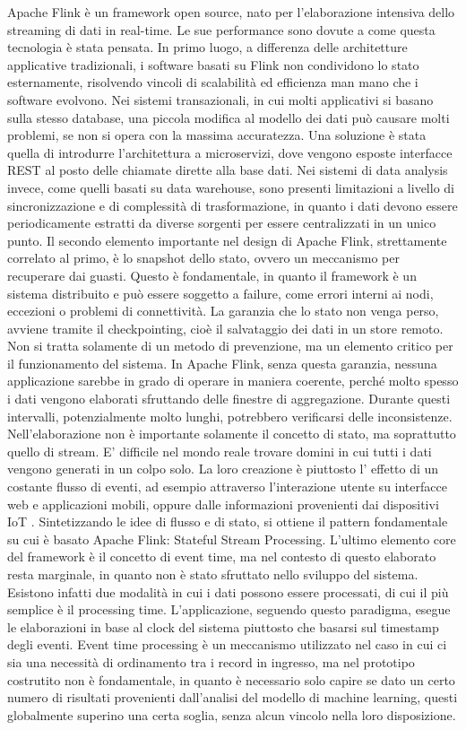 Apache Flink è un framework open source, nato per l'elaborazione intensiva dello streaming di dati in real-time. Le sue performance sono dovute a come questa tecnologia è stata pensata. In primo luogo, a differenza delle architetture applicative tradizionali, i software basati su Flink non condividono lo stato esternamente, risolvendo vincoli di scalabilità ed efficienza man mano che i software evolvono. Nei sistemi transazionali, in cui molti applicativi si basano sulla stesso database, una piccola modifica al modello dei dati può causare molti problemi, se non si opera con la massima accuratezza. Una soluzione è stata quella di introdurre l'architettura a microservizi, dove vengono esposte interfacce REST al posto delle chiamate dirette alla base dati. Nei sistemi di data analysis invece, come quelli basati su data warehouse, sono presenti limitazioni a livello di sincronizzazione e di complessità di trasformazione, in quanto i dati devono essere periodicamente estratti da diverse sorgenti per essere centralizzati in un unico punto. Il secondo elemento importante nel design di Apache Flink, strettamente correlato al primo, è lo snapshot dello stato, ovvero un meccanismo per recuperare dai guasti. Questo è fondamentale, in quanto il framework è un sistema distribuito e può essere soggetto a failure, come errori interni ai nodi, eccezioni o problemi di connettività. La garanzia che lo stato non venga perso, avviene tramite il checkpointing, cioè il salvataggio dei dati in un store remoto. Non si tratta solamente di un metodo di prevenzione, ma un elemento critico per il funzionamento del sistema. In Apache Flink, senza questa garanzia, nessuna applicazione sarebbe in grado di operare in maniera coerente, perché molto spesso i dati vengono elaborati sfruttando delle finestre di aggregazione. Durante questi intervalli, potenzialmente molto lunghi, potrebbero verificarsi delle inconsistenze. Nell'elaborazione non è importante solamente il concetto di stato, ma soprattutto quello di stream. E' difficile nel mondo reale trovare domini in cui tutti i dati vengono generati in un colpo solo. La loro creazione è piuttosto l' effetto di un costante flusso di eventi, ad esempio attraverso l'interazione utente su interfacce web e applicazioni mobili, oppure dalle informazioni provenienti dai dispositivi IoT \cite{a14Flink}.
Sintetizzando le idee di flusso e di stato, si ottiene il pattern fondamentale su cui è basato Apache Flink: Stateful Stream Processing. L'ultimo elemento core del framework è il concetto di event time, ma nel contesto di questo elaborato resta marginale, in quanto non è stato sfruttato nello sviluppo del sistema. %
Esistono infatti due modalità in cui i dati possono essere processati, di cui il più semplice è il processing time. L'applicazione, seguendo questo paradigma, esegue le elaborazioni in base al clock del sistema piuttosto che basarsi sul timestamp degli eventi. Event time processing è un meccanismo utilizzato nel caso in cui ci sia una necessità di ordinamento tra i record in ingresso, ma nel prototipo costrutito non è fondamentale, in quanto è necessario solo capire se dato un certo numero di risultati provenienti dall'analisi del modello di machine learning, questi globalmente superino una certa soglia, senza alcun vincolo nella loro disposizione.

